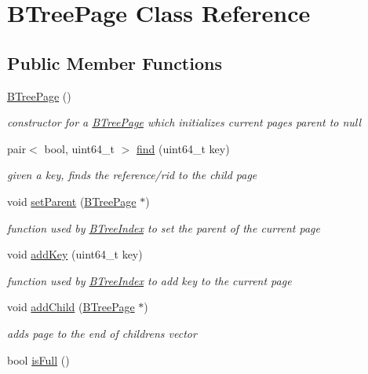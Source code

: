 \hypertarget{class_b_tree_page}{}\section{B\+Tree\+Page Class Reference}
\label{class_b_tree_page}
\subsection*{Public Member Functions}
\begin{DoxyCompactItemize}
\item 
\hypertarget{class_b_tree_page_a18912dc3a549e1e2cb219524cd4e49c6}{}\hyperlink{class_b_tree_page_a18912dc3a549e1e2cb219524cd4e49c6}{B\+Tree\+Page} ()\label{class_b_tree_page_a18912dc3a549e1e2cb219524cd4e49c6}

\begin{DoxyCompactList}\small\item\em constructor for a \hyperlink{class_b_tree_page}{B\+Tree\+Page} which initializes current page\textquotesingle{}s parent to null \end{DoxyCompactList}\item 
pair$<$ bool, uint64\+\_\+t $>$ \hyperlink{class_b_tree_page_ab1a09989306d53d00fad36ec856f1d6a}{find} (uint64\+\_\+t key)
\begin{DoxyCompactList}\small\item\em given a key, finds the reference/rid to the child page \end{DoxyCompactList}\item 
void \hyperlink{class_b_tree_page_a072d6f5aff5dbc4835843a1ce834d6a0}{set\+Parent} (\hyperlink{class_b_tree_page}{B\+Tree\+Page} $\ast$)
\begin{DoxyCompactList}\small\item\em function used by \hyperlink{class_b_tree_index}{B\+Tree\+Index} to set the parent of the current page \end{DoxyCompactList}\item 
void \hyperlink{class_b_tree_page_a6f0a55351b3575f1504a38c8e4ad5891}{add\+Key} (uint64\+\_\+t key)
\begin{DoxyCompactList}\small\item\em function used by \hyperlink{class_b_tree_index}{B\+Tree\+Index} to add key to the current page \end{DoxyCompactList}\item 
void \hyperlink{class_b_tree_page_a603a37a0dbbb8996d21063ecbe03a1c3}{add\+Child} (\hyperlink{class_b_tree_page}{B\+Tree\+Page} $\ast$)
\begin{DoxyCompactList}\small\item\em adds page to the end of children\textquotesingle{}s vector \end{DoxyCompactList}\item 
\hypertarget{class_b_tree_page_a102c6fd32f4c2254c07b1e214530e23e}{}bool \hyperlink{class_b_tree_page_a102c6fd32f4c2254c07b1e214530e23e}{is\+Full} ()\label{class_b_tree_page_a102c6fd32f4c2254c07b1e214530e23e}


\end{DoxyCompactItemize}
